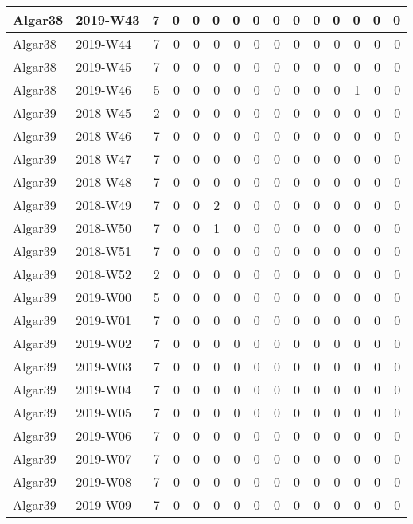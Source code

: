 \documentclass[]{book}
\begin{document}
\begin{table}
\begin{tabular}[t]{l|l|r|r|r|r|r|r|r|r|r|r|r|r|r}
\hline
Algar38 & 2019-W43 & 7 & 0 & 0 & 0 & 0 & 0 & 0 & 0 & 0 & 0 & 0 & 0 & 0\\
\hline
Algar38 & 2019-W44 & 7 & 0 & 0 & 0 & 0 & 0 & 0 & 0 & 0 & 0 & 0 & 0 & 0\\
\hline
Algar38 & 2019-W45 & 7 & 0 & 0 & 0 & 0 & 0 & 0 & 0 & 0 & 0 & 0 & 0 & 0\\
\hline
Algar38 & 2019-W46 & 5 & 0 & 0 & 0 & 0 & 0 & 0 & 0 & 0 & 0 & 1 & 0 & 0\\
\hline
Algar39 & 2018-W45 & 2 & 0 & 0 & 0 & 0 & 0 & 0 & 0 & 0 & 0 & 0 & 0 & 0\\
\hline
Algar39 & 2018-W46 & 7 & 0 & 0 & 0 & 0 & 0 & 0 & 0 & 0 & 0 & 0 & 0 & 0\\
\hline
Algar39 & 2018-W47 & 7 & 0 & 0 & 0 & 0 & 0 & 0 & 0 & 0 & 0 & 0 & 0 & 0\\
\hline
Algar39 & 2018-W48 & 7 & 0 & 0 & 0 & 0 & 0 & 0 & 0 & 0 & 0 & 0 & 0 & 0\\
\hline
Algar39 & 2018-W49 & 7 & 0 & 0 & 2 & 0 & 0 & 0 & 0 & 0 & 0 & 0 & 0 & 0\\
\hline
Algar39 & 2018-W50 & 7 & 0 & 0 & 1 & 0 & 0 & 0 & 0 & 0 & 0 & 0 & 0 & 0\\
\hline
Algar39 & 2018-W51 & 7 & 0 & 0 & 0 & 0 & 0 & 0 & 0 & 0 & 0 & 0 & 0 & 0\\
\hline
Algar39 & 2018-W52 & 2 & 0 & 0 & 0 & 0 & 0 & 0 & 0 & 0 & 0 & 0 & 0 & 0\\
\hline
Algar39 & 2019-W00 & 5 & 0 & 0 & 0 & 0 & 0 & 0 & 0 & 0 & 0 & 0 & 0 & 0\\
\hline
Algar39 & 2019-W01 & 7 & 0 & 0 & 0 & 0 & 0 & 0 & 0 & 0 & 0 & 0 & 0 & 0\\
\hline
Algar39 & 2019-W02 & 7 & 0 & 0 & 0 & 0 & 0 & 0 & 0 & 0 & 0 & 0 & 0 & 0\\
\hline
Algar39 & 2019-W03 & 7 & 0 & 0 & 0 & 0 & 0 & 0 & 0 & 0 & 0 & 0 & 0 & 0\\
\hline
Algar39 & 2019-W04 & 7 & 0 & 0 & 0 & 0 & 0 & 0 & 0 & 0 & 0 & 0 & 0 & 0\\
\hline
Algar39 & 2019-W05 & 7 & 0 & 0 & 0 & 0 & 0 & 0 & 0 & 0 & 0 & 0 & 0 & 0\\
\hline
Algar39 & 2019-W06 & 7 & 0 & 0 & 0 & 0 & 0 & 0 & 0 & 0 & 0 & 0 & 0 & 0\\
\hline
Algar39 & 2019-W07 & 7 & 0 & 0 & 0 & 0 & 0 & 0 & 0 & 0 & 0 & 0 & 0 & 0\\
\hline
Algar39 & 2019-W08 & 7 & 0 & 0 & 0 & 0 & 0 & 0 & 0 & 0 & 0 & 0 & 0 & 0\\
\hline
Algar39 & 2019-W09 & 7 & 0 & 0 & 0 & 0 & 0 & 0 & 0 & 0 & 0 & 0 & 0 & 0\\

\end{tabular}
\end{table}
\end{document}

